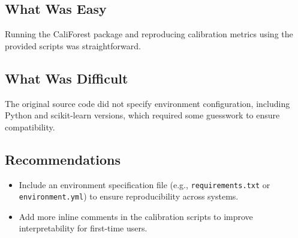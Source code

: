 \documentclass{article}
\begin{document}
\subsection*{What Was Easy}
Running the CaliForest package and reproducing calibration metrics using the provided scripts was straightforward.

\subsection*{What Was Difficult}
The original source code did not specify environment configuration, including Python and scikit-learn versions, which required some guesswork to ensure compatibility.

\subsection*{Recommendations}
\begin{itemize}
\item Include an environment specification file (e.g., \texttt{requirements.txt} or \texttt{environment.yml}) to ensure reproducibility across systems.
\item Add more inline comments in the calibration scripts to improve interpretability for first-time users.
\end{itemize}
\end{document}
